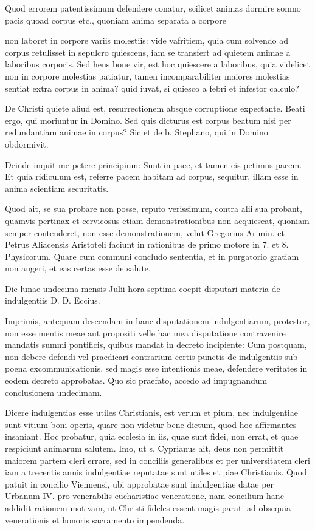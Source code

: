 Quod errorem patentissimum defendere conatur, scilicet animas dormire somno pacis quoad corpus etc., quoniam anima separata a corpore

non laboret in corpore variis molestiis: vide vafritiem, quia cum solvendo ad corpus retulisset in sepulcro quiescens, iam se transfert ad quietem animae a laboribus corporis. Sed heus bone vir, est hoc quiescere a laboribus, quia videlicet non in corpore molestias patiatur, tamen incomparabiliter maiores molestias sentiat extra corpus in anima? quid iuvat, si quiesco a febri et infestor calculo?

De Christi quiete aliud est, resurrectionem absque corruptione expectante. Beati ergo, qui moriuntur in Domino. Sed quis dicturus est corpus beatum nisi per redundantiam animae in corpus? Sic et de b. Stephano, qui in Domino obdormivit.

Deinde inquit me petere principium: Sunt in pace, et tamen eis petimus pacem. Et quia ridiculum est, referre pacem habitam ad corpus, sequitur, illam esse in anima scientiam securitatis.

Quod ait, se sua probare non posse, reputo verissimum, contra alii sua probant, quamvis pertinax et cervicosus etiam demonstrationibus non acquiescat, quoniam semper contenderet, non esse demonstrationem, velut Gregorius Arimin. et Petrus Aliacensis Aristoteli faciunt in rationibus de primo motore in 7. et 8. Physicorum. Quare cum communi concludo sententia, et in purgatorio gratiam non augeri, et eas certas esse de salute.

Die lunae undecima mensis Julii hora septima coepit disputari materia de indulgentiis D. D. Eccius.

Imprimis, antequam descendam in hanc disputationem indulgentiarum, protestor, non esse mentis meae aut propositi velle hac mea disputatione contravenire mandatis summi pontificis, quibus mandat in decreto incipiente: Cum postquam, non debere defendi vel praedicari contrarium certis punctis de indulgentiis sub poena excommunicationis, sed magis esse intentionis meae, defendere veritates in eodem decreto approbatas. Quo sic praefato, accedo ad impugnandum conclusionem undecimam.

Dicere indulgentias esse utiles Christianis, est verum et pium, nec indulgentiae sunt vitium boni operis, quare non videtur bene dictum, quod \marginpar{\small[345]} hoc affirmantes insaniant. Hoc probatur, quia ecclesia in iis, quae sunt fidei, non errat, et quae respiciunt animarum salutem. Imo, ut s. Cyprianus ait, deus non permittit maiorem partem cleri errare, sed in conciliis generalibus et per universitatem cleri iam a trecentis annis indulgentiae reputatae sunt utiles et piae Christianis. Quod patuit in concilio Viennensi, ubi approbatae sunt indulgentiae datae per Urbanum IV. pro venerabilis eucharistiae veneratione, nam concilium hanc addidit rationem motivam, ut Christi fideles essent magis parati ad obsequia venerationis et honoris sacramento impendenda.

